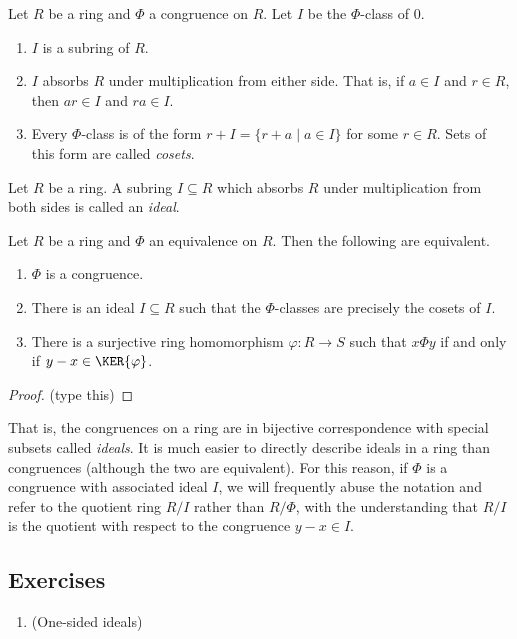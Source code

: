 \documentclass{article}
\begin{document}
\begin{prop}
Let $R$ be a ring and $\Phi$ a congruence on $R$. Let $I$ be the $\Phi$-class of 0.
\begin{enumerate}
\item $I$ is a subring of $R$.
\item $I$ absorbs $R$ under multiplication from either side. That is, if $a \in I$ and $r \in R$, then $ar \in I$ and $ra \in I$.
\item Every $\Phi$-class is of the form $r + I = \{ r+a \mid a \in I \}$ for some $r \in R$. Sets of this form are called \emph{cosets}.
\end{enumerate}
\end{prop}

\begin{dfn}[Ideal]
Let $R$ be a ring. A subring $I \subseteq R$ which absorbs $R$ under multiplication from both sides is called an \emph{ideal}. 
\end{dfn}

\begin{prop}
Let $R$ be a ring and $\Phi$ an equivalence on $R$. Then the following are equivalent.
\begin{enumerate}
\item $\Phi$ is a congruence.
\item There is an ideal $I \subseteq R$ such that the $\Phi$-classes are precisely the cosets of $I$.
\item There is a surjective ring homomorphism $\varphi : R \rightarrow S$ such that $x \Phi y$ if and only if $y-x \in \KER{\varphi}$.
\end{enumerate}
\end{prop}

\begin{proof}
(type this)
\end{proof}

That is, the congruences on a ring are in bijective correspondence with special subsets called \emph{ideals}. It is much easier to directly describe ideals in a ring than congruences (although the two are equivalent). For this reason, if $\Phi$ is a congruence with associated ideal $I$, we will frequently abuse the notation and refer to the quotient ring $R/I$ rather than $R/\Phi$, with the understanding that $R/I$ is the quotient with respect to the congruence $y-x \in I$.

\subsection*{Exercises}

\begin{enumerate}
\item (One-sided ideals)
\end{enumerate}
\end{document}
